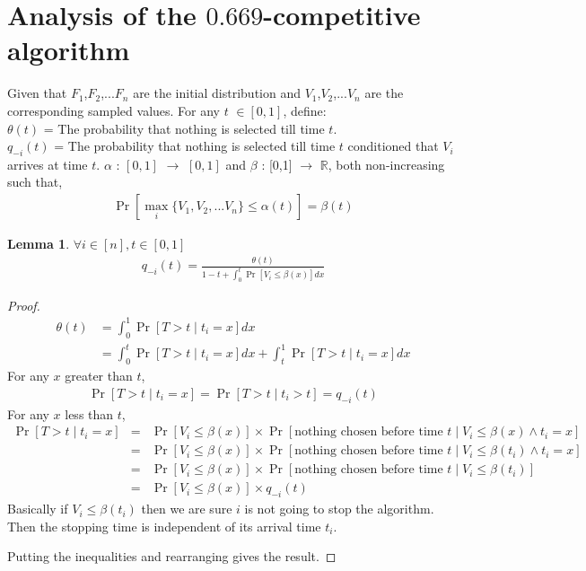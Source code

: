 \documentclass[10pt, letterpaper, twoside]{article}
\newtheorem{lemma}[theorem]{Lemma}
\begin{document}
\section{Analysis of the $0.669$-competitive algorithm}

	Given that $F_{1}$,$F_{2}$,...$F_{n}$ are the initial distribution and $V_{1}$,$V_{2}$,...$V_{n}$ are the corresponding sampled values. For any $t$ $\in [0,1] $, define:\\
	$\theta(t)$ = The probability that nothing is selected till time $t$.\\
	$q_{-i}(t)$ = The probability that nothing is selected till time $t$ conditioned that $V_{i}$ arrives at time $t$.
	$\alpha$ : $[0,1]$ $\rightarrow$ $[0,1]$ and $\beta$ : [0,1] $\rightarrow$ $\mathbb{R}$, both non-increasing such that,
	\begin{align*}
	\Pr[\max_{i} \{V_{1},V_{2},...V_{n}\} \leq \alpha(t)] = \beta(t)
	\end{align*}
	\begin{lemma} $\forall i \in [n], t \in [0,1]$
		\begin{align*}
		q_{-i}(t) = \frac{\theta(t)}{1-t+\int_{0}^{t} \Pr[V_{i} \leq \beta(x)]  dx}
		\end{align*}
	\end{lemma}
	\begin{proof}
		\begin{align*}
		\theta(t) &= \int_{0}^{1} \Pr[T > t \mid t_{i} = x] dx\\
		&= \int_{0}^{t} \Pr[T > t \mid t_{i} = x] dx + \int_{t}^{1} \Pr[T > t \mid t_{i} = x] dx
		\end{align*}
		For any $x$ greater than $t$,
		\begin{align*}
		\Pr[T > t \mid t_{i} = x] = \Pr[T > t \mid t_{i} > t] = q_{-i}(t)
		\end{align*}
		For any $x$ less than $t$,
		\begin{eqnarray*}
			\Pr[T > t \mid t_{i} = x] & = & \Pr[V_{i} \leq \beta(x)] \times \Pr[\text{nothing chosen before time }t \mid V_{i} \leq \beta(x) \wedge t_{i} = x]\\
			& = & \Pr[V_{i} \leq \beta(x)] \times \Pr[\text{nothing chosen before time }t \mid V_{i} \leq \beta(t_i) \wedge t_{i} = x]\\
			& = & \Pr[V_{i} \leq \beta(x)] \times \Pr[\text{nothing chosen before time }t \mid V_{i} \leq \beta(t_i)]\\
			& = & \Pr[V_{i} \leq \beta(x)] \times q_{-i}(t)
		\end{eqnarray*}
		Basically if $V_{i} \leq \beta(t_i)$ then we are sure $i$ is not going to stop the algorithm. Then the stopping time is independent of its arrival time $t_i$.
		
		Putting the inequalities and rearranging gives the result.
	\end{proof}
\end{document}
